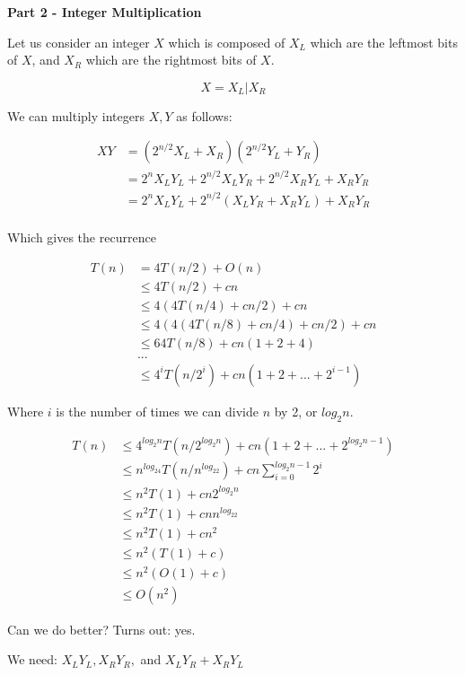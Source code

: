 {\bf Part 2 - Integer Multiplication}

Let us consider an integer $X$ which is composed of $X_L$ which are
the leftmost bits of $X$, and $X_R$ which are the rightmost bits of
$X$.

\begin{displaymath}
X = X_L | X_R
\end{displaymath}

We can multiply integers $X,Y$ as follows:

\begin{align*}
XY
&= (2^{n/2}X_L + X_R)(2^{n/2}Y_L + Y_R) \\
&= 2^n X_LY_L + 2^{n/2}X_LY_R + 2^{n/2}X_RY_L + X_RY_R \\
&= 2^n X_LY_L + 2^{n/2}(X_LY_R + X_RY_L) + X_RY_R \\
\end{align*}

Which gives the recurrence

\begin{align*}
T(n)
&= 4T(n/2) + O(n) \\
&\leq 4T(n/2) + cn \\
&\leq 4(4T(n/4) + cn/2) + cn \\
&\leq 4(4(4T(n/8) + cn/4) + cn/2) + cn \\
&\leq 64T(n/8) + cn(1 + 2 + 4) \\
&... \\
&\leq 4^iT(n/2^i) + cn(1 + 2 + ... + 2^{i-1})
\end{align*}

Where $i$ is the number of times we can divide $n$ by 2, or $log_2n$.

\begin{align*}
T(n)
&\leq 4^{log_2n}T(n/2^{log_2n}) + cn(1 + 2 + ... + 2^{log_2n-1}) \\
&\leq n^{log_24}T(n/n^{log_22}) + cn \sum\limits_{i=0}^{log_2n-1} 2^i \\
&\leq n^2T(1) + cn 2^{log_2n} \\
&\leq n^2T(1) + cn n^{log_22} \\
&\leq n^2T(1) + cn^2 \\
&\leq n^2(T(1) + c) \\
&\leq n^2(O(1) + c) \\
&\leq O(n^2)
\end{align*}

Can we do better?  Turns out: yes.

We need: $X_LY_L, X_RY_R,$ and $X_LY_R + X_RY_L$

